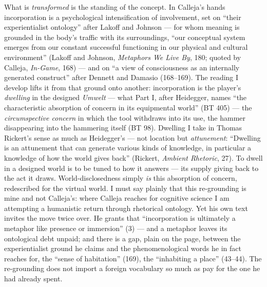 \documentclass{article}
\begin{document}
What is \textit{transformed} is the standing of the concept. In Calleja's hands incorporation is a psychological intensification of involvement, set on ``their experientialist ontology'' after Lakoff and Johnson — for whom meaning is grounded in the body's traffic with its surroundings, ``our conceptual system emerges from our constant successful functioning in our physical and cultural environment'' (Lakoff and Johnson, \textit{Metaphors We Live By}, 180; quoted by Calleja, \textit{In-Game}, 168) — and on ``a view of consciousness as an internally generated construct'' after Dennett and Damasio (168–169). The reading I develop lifts it from that ground onto another: incorporation is the player's \textit{dwelling} in the designed \textit{Umwelt} — what Part I, after Heidegger, names ``the characteristic absorption of concern in its equipmental world'' (BT 405) — the \textit{circumspective concern} in which the tool withdraws into its use, the hammer disappearing into the hammering itself (BT 98). Dwelling I take in Thomas Rickert's sense as much as Heidegger's — not location but \textit{attunement}: ``Dwelling is an attunement that can generate various kinds of knowledge, in particular a knowledge of how the world gives back'' (Rickert, \textit{Ambient Rhetoric}, 27). To dwell in a designed world is to be tuned to how it answers — its supply giving back to the act it draws. World-disclosedness simply \textit{is} this absorption of concern, redescribed for the virtual world. I must say plainly that this re-grounding is mine and not Calleja's: where Calleja reaches for cognitive science I am attempting a humanistic return through rhetorical ontology. Yet his own text invites the move twice over. He grants that ``incorporation is ultimately a metaphor like presence or immersion'' (3) — and a metaphor leaves its ontological debt unpaid; and there is a gap, plain on the page, between the experientialist ground he claims and the phenomenological words he in fact reaches for, the ``sense of habitation'' (169), the ``inhabiting a place'' (43–44). The re-grounding does not import a foreign vocabulary so much as pay for the one he had already spent.
\end{document}

